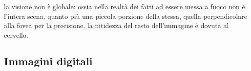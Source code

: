 \documentclass{subfiles}
\begin{document}
\begin{Remark*}
    la visione non è globale: ossia nella realtà dei fatti ad essere messa a fuoco non è l'intera scena, quanto più una piccola porzione della stessa,
    quella perpendicolare alla fovea per la precisione, la nitidezza del resto dell'immagine è dovuta al cervello.
\end{Remark*}

\subsection{Immagini digitali}

\clearpage
\end{document}
